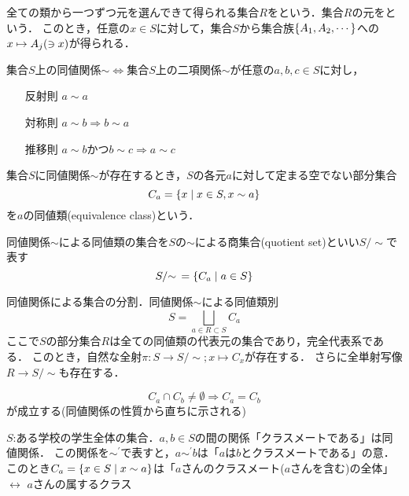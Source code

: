 \documentclass[main]{subfiles}
\begin{document}
		全ての類から一つずつ元を選んできて得られる集合$R$をという．集合$R$の元をという．
		このとき，任意の$x\in S$に対して，集合$S$から集合族$\qty{A_1,A_2,\cdots}$への$x\mapsto A_j\qty(\ni x)$が得られる．

		\begin{dfn}[同値関係]
			集合$S$上の同値関係$\sim\iff$集合$S$上の二項関係$\sim$が任意の$a,b,c\in S$に対し，
			\begin{itemize}
				\item[反射則] $a\sim a$
				\item[対称則] $a\sim b \Rightarrow b\sim a$
				\item[推移則] $a\sim b\text{かつ}b\sim c\Rightarrow a\sim c$
			\end{itemize}
		\end{dfn}

		\begin{dfn}[同値類]
			集合$S$に同値関係$\sim$が存在するとき，$S$の各元$a$に対して定まる空でない部分集合
			\[C_a=\qty{x\mid x\in S,x\sim a}\]
			を$a$の同値類(equivalence class)という．
		\end{dfn}

		\begin{dfn}[商集合]
			同値関係$\sim$による同値類の集合を$S$の$\sim$による商集合(quotient set)といい$S/{\sim}$で表す
			\[S/{\sim}\,=\qty{C_a\mid a\in S}\]
		\end{dfn}

		\begin{dfn}[同値類別]
			同値関係による集合の分割．同値関係$\sim$による同値類別
			\[S=\bigsqcup_{a\in R\subset S}C_a\]
			ここで$S$の部分集合$R$は全ての同値類の代表元の集合であり，完全代表系である．
			このとき，自然な全射$\pi:S\to S/{\sim};x\mapsto C_x$が存在する．
			さらに全単射写像$R\to S/{\sim}$も存在する．
		\end{dfn}
		\begin{screen}
			\[C_a\cap C_b\neq\emptyset\Rightarrow C_a=C_b\]
			が成立する(同値関係の性質から直ちに示される)
		\end{screen}

		\begin{ex}
			$S$:ある学校の学生全体の集合．$a,b\in S$の間の関係「クラスメートである」は同値関係．
			この関係を$\sim^\prime$で表すと，$a\sim^\prime b$は「$a$は$b$とクラスメートである」の意．このとき$C_a=\qty{x\in S\mid x\sim a}$は「$a$さんのクラスメート($a$さんを含む)の全体」$\leftrightarrow$ $a$さんの属するクラス
		\end{ex}
\end{document}
